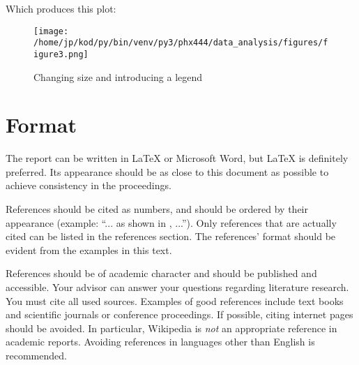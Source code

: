 \documentclass[journal, a4paper]{IEEEtran}
\begin{document}
Which produces this plot:
\begin{figure}[t]
		\begin{center}
		\texttt{[image: /home/jp/kod/py/bin/venv/py3/phx444/data\_analysis/figures/figure3.png]}
		\caption{Changing size and introducing a legend}
		\label{fig:fig_3}
		\end{center}
\end{figure}



\section{Format}
	The report can be written in \LaTeX{} or Microsoft Word, but \LaTeX{} is definitely preferred.
	Its appearance should be as close to this document as possible to achieve consistency in the proceedings.

	References should be cited as numbers, and should be ordered by their appearance (example: ``... as shown in \cite{HOP96}, ...'').
	Only references that are actually cited can be listed in the references section.
	The references' format should be evident from the examples in this text.

	References should be of academic character and should be published and accessible.
	Your advisor can answer your questions regarding literature research.
	You must cite all used sources.
	Examples of good references include text books and scientific journals or conference proceedings.
	If possible, citing internet pages should be avoided. In particular, Wikipedia is \emph{not} an appropriate reference in academic reports.
	Avoiding references in languages other than English is recommended.

\end{document}

